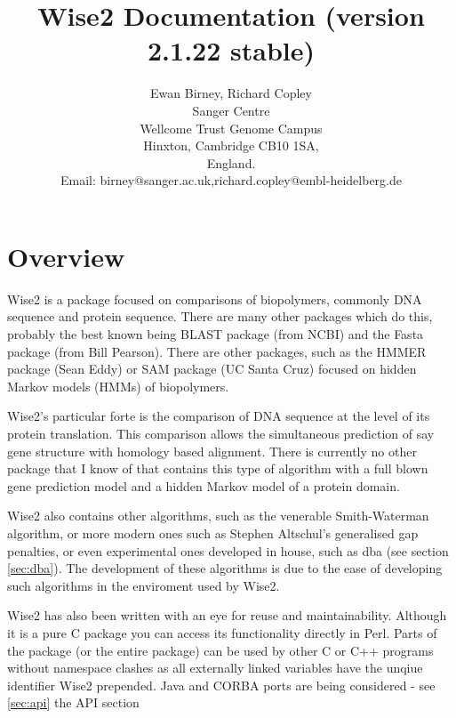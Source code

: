 \documentclass{article}
\begin{document}
\newcommand{\programtext}[1]{{\tt #1}}

\title{Wise2 Documentation (version 2.1.22 stable)}
\author{Ewan Birney, Richard Copley\\
Sanger Centre\\
Wellcome Trust Genome Campus\\
Hinxton, Cambridge CB10 1SA,\\
England.\\
Email: birney@sanger.ac.uk,richard.copley@embl-heidelberg.de}

\maketitle
 
\newpage
\tableofcontents
\newpage

\section{Overview}

Wise2 is a package focused on comparisons of biopolymers, commonly DNA
sequence and protein sequence. There are many other packages which do
this, probably the best known being BLAST package (from NCBI) and the 
Fasta package (from Bill Pearson). There are other packages, such as
the HMMER package (Sean Eddy) or SAM package (UC Santa Cruz) focused
on hidden Markov models (HMMs) of biopolymers.

Wise2's particular forte is the comparison of DNA sequence at the level
of its protein translation. This comparison allows the simultaneous
prediction of say gene structure with homology based alignment. There is
currently no other package that I know of that contains this type of
algorithm with a full blown gene prediction model and a hidden Markov
model of a protein domain.

Wise2 also contains other algorithms, such as the venerable Smith-Waterman
algorithm, or more modern ones such as Stephen Altschul's generalised
gap penalties, or even experimental ones developed in house, such as
dba (see section \ref{sec:dba}). The development of these algorithms
is due to the ease of developing such algorithms in the enviroment
used by Wise2. 

Wise2 has also been written with an eye for reuse and maintainability. 
Although it is a pure C package you can access its functionality 
directly in Perl. Parts of the package (or the entire package) can
be used by other C or C++ programs without namespace clashes as all
externally linked variables have the unqiue identifier Wise2 prepended.
Java and CORBA ports are being considered - see \ref{sec:api} the 
API section
\end{document}
